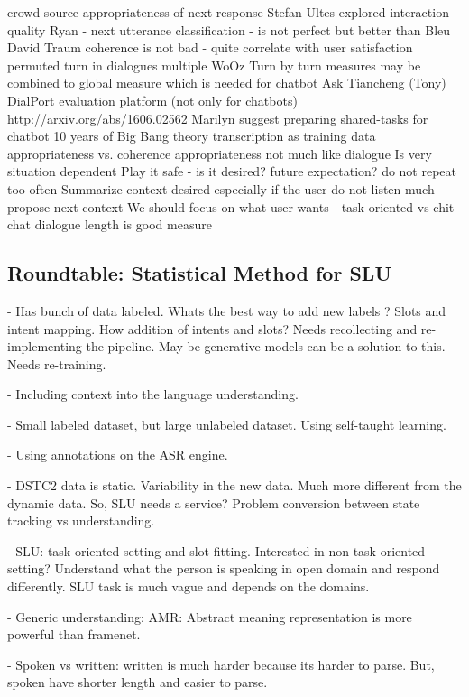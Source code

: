 \documentclass[12pt]{article}
\begin{document}
crowd-source appropriateness of next response
Stefan Ultes explored interaction quality
Ryan - next utterance classification - is not perfect but better than Bleu
David Traum
coherence is not bad - quite correlate with user satisfaction
 permuted turn in dialogues
 multiple WoOz
Turn by turn measures
 may be combined to global measure which is needed for chatbot
Ask Tiancheng (Tony)
DialPort evaluation platform (not only for chatbots) http://arxiv.org/abs/1606.02562
Marilyn suggest preparing shared-tasks for chatbot
10 years of Big Bang theory transcription as training data
appropriateness vs. coherence
appropriateness
not much like dialogue
Is very situation dependent
Play it safe - is it desired?
future expectation?
do not repeat too often
Summarize context
desired especially if the user do not listen much
propose next context
We should focus on what user wants - task oriented vs chit-chat
dialogue length is good measure

\subsection{Roundtable: Statistical Method for SLU}

- Has bunch of data labeled. Whats the best way to add new labels ? Slots and intent mapping. How addition of intents and slots? Needs recollecting and re-implementing the pipeline. May be generative models can be a solution to this. Needs re-training.

- Including context into the language understanding.

- Small labeled dataset, but large unlabeled dataset. Using self-taught learning.

- Using annotations on the ASR engine.

- DSTC2 data is static. Variability in the new data. Much more different from the dynamic data. So, SLU needs a service? Problem conversion between state tracking vs understanding.

- SLU: task oriented setting and slot fitting. Interested in non-task oriented setting? Understand what the person is speaking in open domain and respond differently. SLU task is much vague and depends on the domains.

- Generic understanding: AMR: Abstract meaning representation is more powerful than framenet.

- Spoken vs written: written is much harder because its harder to parse. But, spoken have shorter length and easier to parse.
\end{document}
